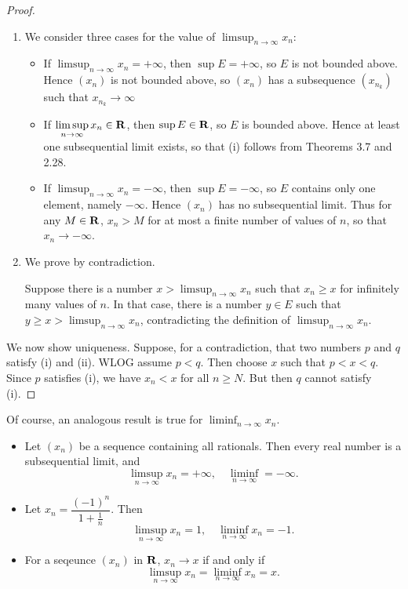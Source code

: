 \begin{proof} \
\begin{enumerate}[label=(\roman*)]
\item We consider three cases for the value of $\displaystyle\limsup_{n\to\infty}x_n$:
\begin{itemize}
    \item If $\displaystyle\limsup_{n\to\infty}x_n=+\infty$, then $\sup E=+\infty$, so $E$ is not bounded above. Hence $(x_n)$ is not bounded above, so $(x_n)$ has a subsequence $(x_{n_k})$ such that $x_{n_k}\to\infty$
    \item If $\displaystyle\limsup_{n\to\infty}x_n\in\mathbf R$, then $\sup E\in\mathbf R$, so $E$ is bounded above. Hence at least one subsequential limit exists, so that (i) follows from Theorems 3.7 and 2.28.
    \item If $\displaystyle\limsup_{n\to\infty}x_n=-\infty$, then $\sup E=-\infty$, so $E$ contains only one element, namely $-\infty$. Hence $(x_n)$ has no subsequential limit. Thus for any $M\in\mathbf R$, $x_n>M$ for at most a finite number of values of $n$, so that $x_n\to-\infty$.
\end{itemize}
\item We prove by contradiction.

Suppose there is a number $\displaystyle x>\limsup_{n\to\infty}x_n$ such that $x_n\ge x$ for infinitely many values of $n$. In that case, there is a number $y\in E$ such that $\displaystyle y\ge x>\limsup_{n\to\infty}x_n$, contradicting the definition of $\displaystyle\limsup_{n\to\infty}x_n$.
\end{enumerate}

We now show uniqueness. Suppose, for a contradiction, that two numbers $p$ and $q$ satisfy (i) and (ii). WLOG assume $p<q$. Then choose $x$ such that $p<x<q$. Since $p$ satisfies (i), we have $x_n<x$ for all $n\ge N$. But then $q$ cannot satisfy (i).
\end{proof}

Of course, an analogous result is true for $\displaystyle\liminf_{n\to\infty}x_n$. 

\begin{example}
\begin{itemize}
\item Let $(x_n)$ be a sequence containing all rationals. Then every real number is a subsequential limit, and 
\[\limsup_{n\to\infty}x_n=+\infty,\quad\liminf_{n\to\infty}=-\infty.\]

\item Let $x_n=\dfrac{(-1)^n}{1+\frac{1}{n}}$. Then
\[\limsup_{n\to\infty}x_n=1,\quad\liminf_{n\to\infty}x_n=-1.\]

\item For a seqeunce $(x_n)$ in $\mathbf R$, $x_n\to x$ if and only if
\[\limsup_{n\to\infty}x_n=\liminf_{n\to\infty}x_n=x.\]
\end{itemize}
\end{example}

